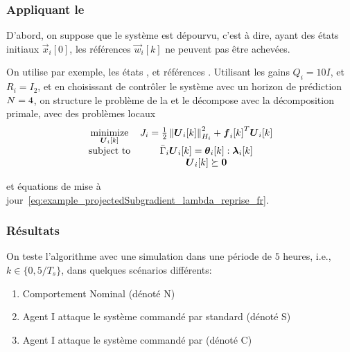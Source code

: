 \documentclass[../main.tex]{subfiles}
\begin{document}
\subsubsection{Appliquant le \rpdmpcss{}}
D'abord, on suppose que le système est dépourvu, c'est à dire, ayant des états initiaux $\vec{x}_{i}[0]$, les références $\vec{w}_{i}[k]$ ne peuvent pas être achevées.

On utilise par exemple, les états
,
et références
\nolinebreak.
Utilisant les gains
$Q_{i}=10I$,
et
$R_{i}=   I_{2}$,
et en choisissant de contrôler le système avec un horizon de prédiction
$N=4$,
on structure le problème de la \dmpc{} et le décompose avec la décomposition primale, avec des problèmes locaux
\begin{equation}
  \label{eq:houses_deprived_local_problem_fr}
  \begin{matrix}
    \minimize\limits_{\vec{U}_{i}[k]}&\obji=\frac{1}{2}\norm{\vec{U}_{i}[k]}^{2}_{H_{i}} + {\vec{f}_{i}[k]}^{T}\vec{U}_{i}[k]\\
    \mathrm{subject~ to} & \bar{\Gamma}_{i}\vec{U}_{i}[k] = \thetaik:\lambdaik\\
                                     &\vec{U}_{i}[k]\succeq\0
  \end{matrix}
\end{equation}

et équations de mise à jour~\eqref{eq:example_projectedSubgradient_lambda_reprise_fr}.

\subsubsection{Résultats}\label{sec:results_fr}
On teste l'algorithme avec une simulation dans une période de
$5$
heures, i.e.,
${k\in\{0,5/T_{s}\}}$,
dans quelques scénarios différents:
\begin{enumerate}
  \item Comportement Nominal (dénoté N)
  \item Agent I attaque le système commandé par \dmpc{} standard (dénoté S)\label{it:case_selfish_fr}
  \item Agent I attaque le système commandé par \rpdmpcss{} (dénoté C)\label{it:case_selfish_recovered_fr}
\end{enumerate}
\end{document}
